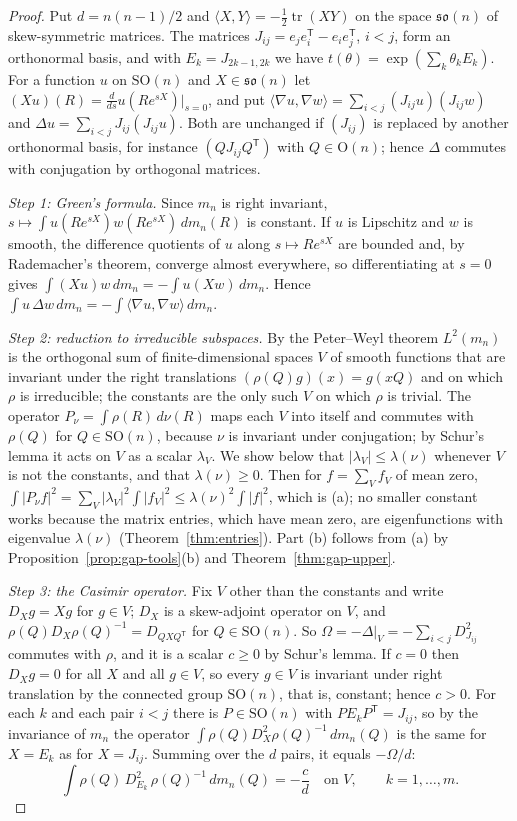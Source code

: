 \documentclass[11pt]{amsart}
\theoremstyle{definition}
\theoremstyle{remark}
\newcommand{\SO}{\mathrm{SO}}
\newcommand{\Or}{\mathrm{O}}
\newcommand{\tr}{\operatorname{tr}}
\newcommand{\ip}[2]{\langle #1,#2\rangle}
\newcommand{\transp}{^{\mathsf T}}
\begin{document}
\begin{proof}
Put $d=n(n-1)/2$ and $\ip XY=-\frac12\tr(XY)$ on the space $\mathfrak{so}(n)$ of skew-symmetric
matrices.  The matrices $J_{ij}=e_je_i\transp-e_ie_j\transp$, $i<j$, form an orthonormal basis,
and with $E_k=J_{2k-1,2k}$ we have $t(\theta)=\exp(\sum_k\theta_kE_k)$.  For a function $u$ on
$\SO(n)$ and $X\in\mathfrak{so}(n)$ let $(Xu)(R)=\frac d{ds}u(Re^{sX})|_{s=0}$, and put
$\ip{\nabla u}{\nabla w}=\sum_{i<j}(J_{ij}u)(J_{ij}w)$ and $\Delta u=\sum_{i<j}J_{ij}(J_{ij}u)$.
Both are unchanged if $(J_{ij})$ is replaced by another orthonormal basis, for instance
$(QJ_{ij}Q\transp)$ with $Q\in\Or(n)$; hence $\Delta$ commutes with conjugation by orthogonal
matrices.

\emph{Step 1: Green's formula.}  Since $m_n$ is right invariant,
$s\mapsto\int u(Re^{sX})w(Re^{sX})\,dm_n(R)$ is constant.  If $u$ is Lipschitz and $w$ is smooth,
the difference quotients of $u$ along $s\mapsto Re^{sX}$ are bounded and, by Rademacher's theorem,
converge almost everywhere, so differentiating at $s=0$ gives $\int(Xu)w\,dm_n=-\int u(Xw)\,dm_n$.
Hence $\int u\,\Delta w\,dm_n=-\int\ip{\nabla u}{\nabla w}\,dm_n$.

\emph{Step 2: reduction to irreducible subspaces.}  By the Peter--Weyl theorem $L^2(m_n)$ is the
orthogonal sum of finite-dimensional spaces $V$ of smooth functions that are invariant under the
right translations $(\rho(Q)g)(x)=g(xQ)$ and on which $\rho$ is irreducible; the constants are the
only such $V$ on which $\rho$ is trivial.  The operator $P_\nu=\int\rho(R)\,d\nu(R)$ maps each $V$
into itself and commutes with $\rho(Q)$ for $Q\in\SO(n)$, because $\nu$ is invariant under
conjugation; by Schur's lemma it acts on $V$ as a scalar $\lambda_V$.  We show below that
$|\lambda_V|\le\lambda(\nu)$ whenever $V$ is not the constants, and that $\lambda(\nu)\ge0$.  Then
for $f=\sum_Vf_V$ of mean zero,
$\int|P_\nu f|^2=\sum_V|\lambda_V|^2\int|f_V|^2\le\lambda(\nu)^2\int|f|^2$, which is (a); no
smaller constant works because the matrix entries, which have mean zero, are eigenfunctions with
eigenvalue $\lambda(\nu)$ (Theorem~\ref{thm:entries}).  Part (b) follows from (a) by
Proposition~\ref{prop:gap-tools}(b) and Theorem~\ref{thm:gap-upper}.

\emph{Step 3: the Casimir operator.}  Fix $V$ other than the constants and write $D_Xg=Xg$ for
$g\in V$; $D_X$ is a skew-adjoint operator on $V$, and $\rho(Q)D_X\rho(Q)^{-1}=D_{QXQ\transp}$ for
$Q\in\SO(n)$.  So $\Omega=-\Delta|_V=-\sum_{i<j}D_{J_{ij}}^2$ commutes with $\rho$, and it is a
scalar $c\ge0$ by Schur's lemma.  If $c=0$ then $D_Xg=0$ for all $X$ and all $g\in V$, so every
$g\in V$ is invariant under right translation by the connected group $\SO(n)$, that is, constant;
hence $c>0$.  For each $k$ and each pair $i<j$ there is $P\in\SO(n)$ with $PE_kP\transp=J_{ij}$,
so by the invariance of $m_n$ the operator $\int\rho(Q)D_X^2\rho(Q)^{-1}\,dm_n(Q)$ is the same for
$X=E_k$ as for $X=J_{ij}$.  Summing over the $d$ pairs, it equals $-\Omega/d$:
\begin{equation}\label{eq:casimir-avg}
  \int\rho(Q)\,D_{E_k}^2\,\rho(Q)^{-1}\,dm_n(Q)=-\frac cd\quad\text{on }V,\qquad k=1,\dots,m.
\end{equation}


\end{proof}
\end{document}
